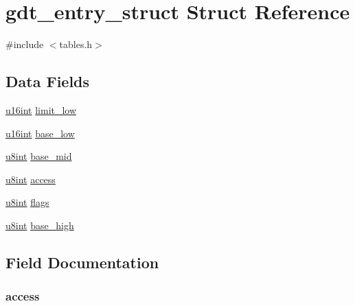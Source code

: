 \hypertarget{structgdt__entry__struct}{}\section{gdt\+\_\+entry\+\_\+struct Struct Reference}
\label{structgdt__entry__struct}


{\ttfamily \#include $<$tables.\+h$>$}

\subsection*{Data Fields}
\begin{DoxyCompactItemize}
\item 
\hyperlink{system_8h_a863d9497073aad2b991aeab2211d87af}{u16int} \hyperlink{structgdt__entry__struct_af9013229edfb91d4820f66b8df890ce3}{limit\+\_\+low}
\item 
\hyperlink{system_8h_a863d9497073aad2b991aeab2211d87af}{u16int} \hyperlink{structgdt__entry__struct_a0a776dced2c26f16298425cde39f8364}{base\+\_\+low}
\item 
\hyperlink{system_8h_a1026e682ffdadc1701c42cd44ce9efcf}{u8int} \hyperlink{structgdt__entry__struct_a35c709a004babd09046db9f667ba0646}{base\+\_\+mid}
\item 
\hyperlink{system_8h_a1026e682ffdadc1701c42cd44ce9efcf}{u8int} \hyperlink{structgdt__entry__struct_a360a726ac0b61d9e4e1be3ad34f80244}{access}
\item 
\hyperlink{system_8h_a1026e682ffdadc1701c42cd44ce9efcf}{u8int} \hyperlink{structgdt__entry__struct_a138dda98fcd4738346af61bcca8cf4b4}{flags}
\item 
\hyperlink{system_8h_a1026e682ffdadc1701c42cd44ce9efcf}{u8int} \hyperlink{structgdt__entry__struct_a706c81b840522a69ab6e6e941630d5e4}{base\+\_\+high}
\end{DoxyCompactItemize}


\subsection{Field Documentation}
\subsubsection[{\texorpdfstring{access}{access}}]{ access}\hypertarget{structgdt__entry__struct_a360a726ac0b61d9e4e1be3ad34f80244}{}\label{structgdt__entry__struct_a360a726ac0b61d9e4e1be3ad34f80244}
